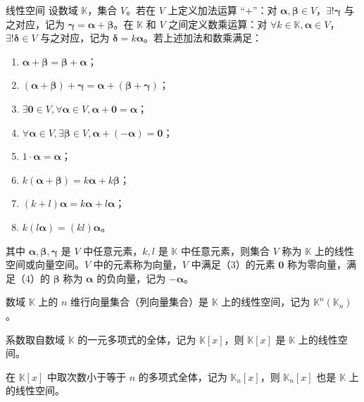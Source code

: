 \begin{definition}{线性空间}
  设数域 $\mathbb{K}$，集合 $V$。若在 $V$ 上定义加法运算 “$+$”：对 $\bm{\alpha},\bm{\beta} \in V$，$\exists !\bm{\gamma}$ 与之对应，记为 $\bm{\gamma} = \bm{\alpha} + \bm{\beta}$。在 $\mathbb{K}$ 和 $V$ 之间定义数乘运算：对 $\forall k \in \mathbb{K}, \bm{\alpha}\in V$，$\exists !\bm{\delta}\in V$ 与之对应，记为 $\bm{\delta} = k\bm{\alpha}$。若上述加法和数乘满足：
  \begin{enumerate}
    \item $\bm{\alpha} + \bm{\beta} = \bm{\beta} + \bm{\alpha}$；
    \item $(\bm{\alpha} + \bm{\beta}) + \bm{\gamma} = \bm{\alpha} + (\bm{\beta} + \bm{\gamma})$；
    \item $\exists \bm{0}\in V, \forall \bm{\alpha}\in V, \bm{\alpha} + \bm{0} = \bm{\alpha}$；
    \item $\forall \bm{\alpha} \in V, \exists \bm{\beta} \in V, \bm{\alpha} + (-\bm{\alpha}) = \bm{0}$；
    \item $1 \cdot\bm{\alpha}= \bm{\alpha}$；
    \item $k(\bm{\alpha} + \bm{\beta}) = k\bm{\alpha} + k\bm{\beta}$；
    \item $(k + l)\bm{\alpha} = k\bm{\alpha} + l\bm{\alpha}$；
    \item $k(l\bm{\alpha}) = (kl)\bm{\alpha}$。
  \end{enumerate}
  其中 $\bm{\alpha},\bm{\beta},\bm{\gamma}$ 是 $V$ 中任意元素，$k,l$ 是 $\mathbb{K}$ 中任意元素，则集合 $V$ 称为 $\mathbb{K}$ 上的线性空间或向量空间。$V$ 中的元素称为向量，$V$ 中满足（3）的元素 $\bm{0}$ 称为零向量，满足（4）的 $\bm{\beta}$ 称为 $\bm{\alpha}$ 的负向量，记为 $-\bm{\alpha}$。
\end{definition}

\hfill

\begin{example}
  数域 $\mathbb{K}$ 上的 $n$ 维行向量集合（列向量集合）是 $\mathbb{K}$ 上的线性空间，记为 $\mathbb{K}^n(\mathbb{K}_n)$。
\end{example}

\hfill

\begin{example}
  系数取自数域 $\mathbb{K}$ 的一元多项式的全体，记为 $\mathbb{K}[x]$，则 $\mathbb{K}[x]$ 是 $\mathbb{K}$ 上的线性空间。

  在 $\mathbb{K}[x]$ 中取次数小于等于 $n$ 的多项式全体，记为 $\mathbb{K}_n[x]$，则 $\mathbb{K}_n[x]$ 也是 $\mathbb{K}$ 上的线性空间。
\end{example}

